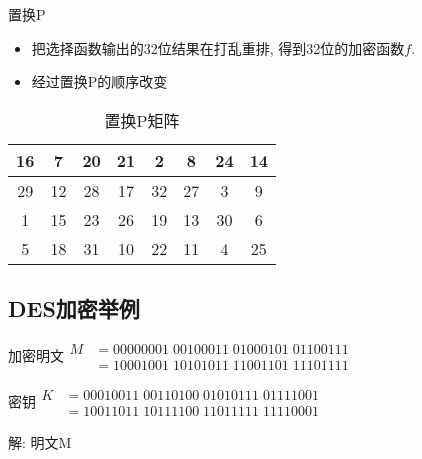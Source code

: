 \documentclass[UTF8]{ctexart}
\begin{document}
\begin{itemize}
\begin{enumerate}
            [3] 置换P
            \begin{itemize}
                \item 把选择函数输出的32位结果在打乱重排, 得到32位的加密函数$f$.
                \item 经过置换P的顺序改变
            \end{itemize}
            \begin{table}[h]
                \centering
                \caption{置换P矩阵}
                \begin{tabular}{|c|c|c|c|c|c|c|c|}
                    \hline
                    16 &7 &20 &21 &2 &8 &24 &14\\
                    \hline
                    29 &12 &28 &17 &32 &27 &3 &9\\
                    \hline
                    1 &15 &23 &26 &19 &13 &30 &6\\
                    \hline
                    5 &18 &31 &10 &22 &11 &4 &25\\
                    \hline
                \end{tabular}
            \end{table}
        \end{enumerate}
    \end{itemize}

    \subsection{DES加密举例}
    加密明文$
    \begin{aligned}
        M&=00000001\; 00100011\; 01000101\; 01100111\\
         &=10001001\; 10101011\; 11001101\; 11101111
    \end{aligned}
    $

    密钥$
    \begin{aligned}
        K&=00010011\; 00110100\; 01010111\; 01111001\\
         &=10011011\; 10111100\; 11011111\; 11110001
    \end{aligned}
    $

    解: 明文M
\end{document}
